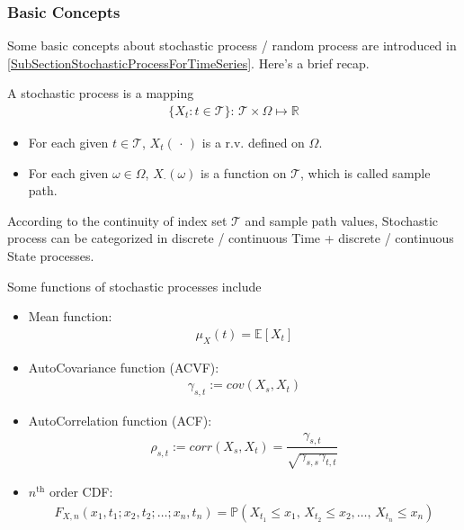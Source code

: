 \subsubsection{Basic Concepts}
Some basic concepts about stochastic process / random process are introduced in \autoref{SubSectionStochasticProcessForTimeSeries}. Here's a brief recap.

A stochastic process is a mapping
\begin{align}
     \{X_t:t\in\mathcal{T}\}:\, \mathcal{T}\times\Omega \mapsto \mathbb{R}
\end{align}

\begin{itemize}[topsep=2pt,itemsep=0pt]
    \item For each given $ t \in\mathcal{T}$, $ X_t(\, \cdot \, ) $ is a r.v. defined on $ \Omega  $.
    \item For each given $ \omega \in \Omega  $, $ X_\cdot (\omega ) $ is a function on $ \mathcal{T} $, which is called sample path.
\end{itemize}

According to the continuity of index set $ \mathcal{T} $ and sample path values, Stochastic process can be categorized in discrete / continuous Time + discrete / continuous State processes.

Some functions of stochastic processes include
\begin{itemize}[topsep=2pt,itemsep=0pt]
    \item Mean function:
    \begin{align}
        \mu _X(t)=\mathbb{E}\left[ X_t \right]  
    \end{align}
    \item AutoCovariance function (ACVF):
    \begin{align}
        \gamma _{s,t}:=cov(X_s,X_t)
    \end{align}
    \item AutoCorrelation function (ACF):
    \begin{align}
        \rho _{s,t}:=corr(X_s,X_t)=\dfrac{\gamma _{s,t}}{\sqrt{\gamma _{s,s}\gamma _{t,t}}} 
    \end{align}
    \item $ n^\mathrm{th}  $ order CDF:
    \begin{align}
        F_{X,n}(x_1,t_1;x_2,t_2;\ldots;x_n,t_n)=\mathbb{P}\left( X_{t_1}\leq x_1,\,X_{t_2}\leq x_2,\ldots,\,X_{t_n}\leq x_n \right)  
    \end{align}
   
\end{itemize}


